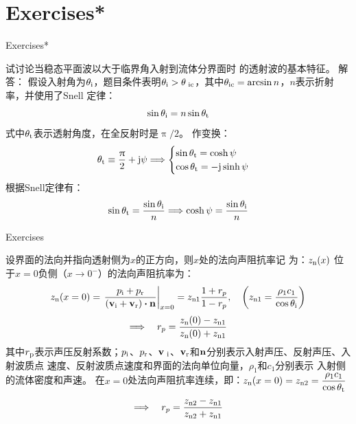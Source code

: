 \documentclass[9pt,mathserif]{beamer}
\let\emph\relax %
\begin{document}
\section{Exercises*}
\begin{frame}{Exercises*}
	\begin{outline}
		\1 \emph{2.} 试讨论当稳态平面波以大于临界角入射到流体分界面时
		的透射波的基本特征。
		\1 解答：
		\1 假设入射角为$\theta_\text{i}$，题目条件表明$\theta_\text{i}>\theta_\text{
		ic}$，其中$\theta_\text{ic}=\arcsin n$，$n$表示折射率，并使用了Snell
		定律：
		$$\sin\theta_\text{i} = n\sin\theta_\text{t}$$
		\1 式中$\theta_\text{t}$表示透射角度，在全反射时是$\uppi/2$。
		\1 作变换：
		$$\theta_\text{t} \equiv  \frac{\uppi}{2} +\mathrm{j} \psi 
		\Longrightarrow
		\begin{cases}
			\sin\theta _\text{t} = \cosh \psi\\
			\cos \theta_\text{t} = -\mathrm{j} \sinh \psi
		\end{cases}
		$$
		\1 根据Snell定律有：
		$$
		\sin \theta_\text{t} = \frac{\sin\theta_\text{i}}{n} \Longrightarrow
		\cosh \psi = \frac{\sin \theta _\text{i}}{n}$$
	\end{outline}
\end{frame}

\begin{frame}{Exercises}
	\begin{outline}
		\1 设界面的法向并指向透射侧为$x$的正方向，则$x$处的法向声阻抗率记
		为：$z_\text{n}(x)$
		\1 位于$x=0$负侧（$x\to 0^-$）的法向声阻抗率为：
		$$z\st{n}(x=0) = \left. \frac{p\st{i}+p\st{r}}{(\vb{v}\st{i} +\vb{v}\st{r})\vdot\vb{n}}\right|
		_{x=0} = z\st{n1} \frac{1+r_p}{1-r_p}
		\qc \qty(z\st{n1} = \dfrac{\rho_1c_1}{\cos\theta\st{i}})$$
		$$\Longrightarrow \quad r_p = \frac{z_\text{n}(0) - z_\text{n1}}{z_\text{n}(0)+z_\text{n1}}$$
		\1 其中$r_\text{p}$表示声压反射系数；$p_\text{i}$、$p_\text{r}$、$\vb{v}_\text{
		i}$、$\vb{v}_\text{r}$和$\vb{n}$分别表示入射声压、反射声压、入射波质点
		速度、反射波质点速度和界面的法向单位向量，$\rho_1$和$c_1$分别表示
		入射侧的流体密度和声速。
		\1 在$x=0$处法向声阻抗率连续，即：$z_\text{n}(x=0) = z_\text{n2} = \dfrac{
		\rho_1c_1}{\cos\theta_\text{t}}$
		$$\Longrightarrow \quad r_p = \frac{z_\text{n2}-z_\text{n1}}{z_\text{n2}+z_\text{n1}}$$
	\end{outline}
\end{frame}
\end{document}
